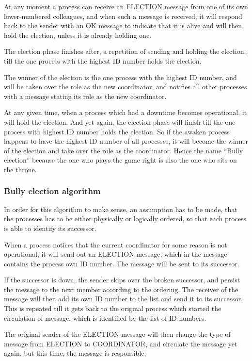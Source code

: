 At any moment a process can receive an ELECTION message from one of its own lower-numbered colleagues, and when such a message is received, it will respond back to the sender with an OK message to indicate that it is alive and will then hold the election, unless it is already holding one.

The election phase finishes after, a repetition of sending and holding the election, till the one process with the highest ID number holds the election.

The winner of the election is the one process with the highest ID number, and will be taken over the role as the new coordinator, and notifies all other processes with a message stating its role as the new coordinator. 

At any given time, when a process which had a downtime becomes operational, it will hold the election.
And yet again, the election phase will finish till the one process with highest ID number holds the election. So if the awaken process happens to have the highest ID number of all processes, it will become the winner of the election and take over the role as the coordinator. Hence the name “Bully election” because the one who plays the game right is also the one who sits on the throne.

\subsubsection{Bully election algorithm}
In order for this algorithm to make sense, an assumption has to be made, that the processes has to be either physically or logically ordered, so that each process is able to identify its successor.

When a process notices that the current coordinator for some reason is not operational, it will send out an ELECTION message, which in the message contains the process own ID number. The message will be sent to its successor. 

If the successor is down, the sender skips over the broken successor, and persist the message to the next member according to the ordering. The receiver of the message will then add its own ID number to the list and send it to its successor. This is repeated till it gets back to the original process which started the circulation of message, which is identified by the list of ID numbers.

The original sender of the ELECTION message will then change the type of message from ELECTION to COORDINATOR, and circulate the message yet again, but this time, the message is responsible:

